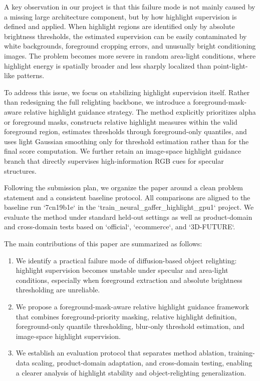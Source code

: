 \documentclass[UTF8,a4paper]{ctexart}
\begin{document}
A key observation in our project is that this failure mode is not mainly caused by a missing large architecture component, but by how highlight supervision is defined and applied. When highlight regions are identified only by absolute brightness thresholds, the estimated supervision can be easily contaminated by white backgrounds, foreground cropping errors, and unusually bright conditioning images. The problem becomes more severe in random area-light conditions, where highlight energy is spatially broader and less sharply localized than point-light-like patterns.

To address this issue, we focus on stabilizing highlight supervision itself. Rather than redesigning the full relighting backbone, we introduce a foreground-mask-aware relative highlight guidance strategy. The method explicitly prioritizes alpha or foreground masks, constructs relative highlight measures within the valid foreground region, estimates thresholds through foreground-only quantiles, and uses light Gaussian smoothing only for threshold estimation rather than for the final score computation. We further retain an image-space highlight guidance branch that directly supervises high-information RGB cues for specular structures.

Following the submission plan, we organize the paper around a clean problem statement and a consistent baseline protocol. All comparisons are aligned to the baseline run `7cn19b1e` in the `train_neural_gaffer_highlight_gpu1` project. We evaluate the method under standard held-out settings as well as product-domain and cross-domain tests based on `official`, `ecommerce`, and `3D-FUTURE`.

The main contributions of this paper are summarized as follows:

\begin{enumerate}
\item We identify a practical failure mode of diffusion-based object relighting: highlight supervision becomes unstable under specular and area-light conditions, especially when foreground extraction and absolute brightness thresholding are unreliable.
\item We propose a foreground-mask-aware relative highlight guidance framework that combines foreground-priority masking, relative highlight definition, foreground-only quantile thresholding, blur-only threshold estimation, and image-space highlight supervision.
\item We establish an evaluation protocol that separates method ablation, training-data scaling, product-domain adaptation, and cross-domain testing, enabling a clearer analysis of highlight stability and object-relighting generalization.
\end{enumerate}
\end{document}
